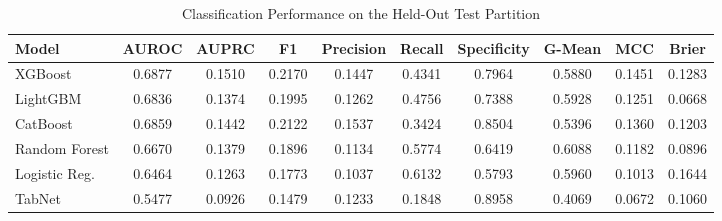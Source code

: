 \begin{table}
\centering
\caption{Classification Performance on the Held-Out Test Partition}
\label{tab:results}
\begin{tabular}{lccccccccc}
\toprule
Model & AUROC & AUPRC & F1 & Precision & Recall & Specificity & G-Mean & MCC & Brier \\
\midrule
XGBoost & 0.6877 & 0.1510 & 0.2170 & 0.1447 & 0.4341 & 0.7964 & 0.5880 & 0.1451 & 0.1283 \\
LightGBM & 0.6836 & 0.1374 & 0.1995 & 0.1262 & 0.4756 & 0.7388 & 0.5928 & 0.1251 & 0.0668 \\
CatBoost & 0.6859 & 0.1442 & 0.2122 & 0.1537 & 0.3424 & 0.8504 & 0.5396 & 0.1360 & 0.1203 \\
Random Forest & 0.6670 & 0.1379 & 0.1896 & 0.1134 & 0.5774 & 0.6419 & 0.6088 & 0.1182 & 0.0896 \\
Logistic Reg. & 0.6464 & 0.1263 & 0.1773 & 0.1037 & 0.6132 & 0.5793 & 0.5960 & 0.1013 & 0.1644 \\
TabNet & 0.5477 & 0.0926 & 0.1479 & 0.1233 & 0.1848 & 0.8958 & 0.4069 & 0.0672 & 0.1060 \\
\bottomrule
\end{tabular}
\end{table}
